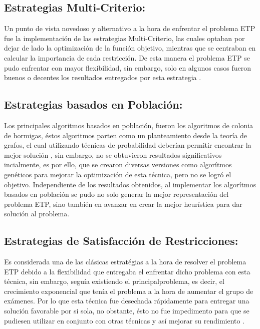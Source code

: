 \documentclass[letter, 10pt]{article}
\begin{document}
\subsection{Estrategias Multi-Criterio:}
Un punto de vista novedoso y alternativo a la hora de enfrentar el problema ETP fue la implementación de las estrategias Multi-Criterio, las cuales optaban por dejar de lado la optimización de la función objetivo, mientras que se centraban en calcular la importancia de cada restricción. De esta manera el problema ETP se pudo enfrentar con mayor flexibilidad, sin embargo, solo en algunos casos fueron buenos o decentes los resultados entregados por esta estrategia \cite{Cita17}. 

\subsection{Estrategias basados en Población:}
Los principales algoritmos basados en población, fueron los algoritmos de colonia de hormigas, éstos algoritmos parten como un planteamiento desde la teoría de grafos, el cual utilizando técnicas de probabilidad deberían permitir encontrar la mejor solución \cite{Cita21}, sin embargo, no se obtuvieron resultados significativos incialmente, es por ello, que se crearon diversas versiones como algorítmos genéticos \cite{Cita22} para mejorar la optimización de esta técnica, pero no se logró el objetivo. Independiente de los resultados obtenidos, al implementar los algorítmos basados en población se pudo no solo generar la mejor representación del problema ETP, sino también en avanzar en crear la mejor heurística para dar solución al problema.

\subsection{Estrategias de Satisfacción de Restricciones:}
Es considerada una de las clásicas estratégias a la hora de resolver el problema ETP debido a la flexibilidad que entregaba el enfrentar dicho problema con esta técnica, sin embargo, seguía existiendo el principalproblema, es decir, el crecimiento exponencial que tenía el problema a la hora de aumentar el grupo de exámenes. Por lo que esta técnica fue desechada rápidamente para entregar una solución favorable por si sola, no obstante, ésto no fue impedimento para que se pudiesen utilizar en conjunto con otras técnicas y así mejorar su rendimiento \cite{Cita20}.
\end{document}
